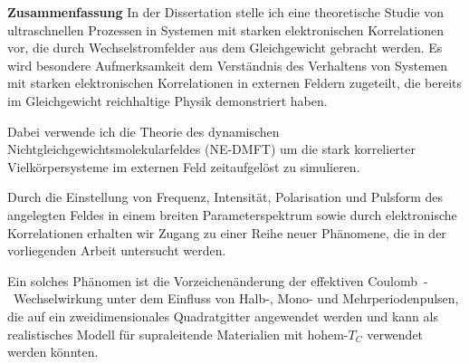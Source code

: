 






    

\textbf{Zusammenfassung} In der Dissertation stelle ich eine theoretische Studie von ultraschnellen Prozessen in Systemen mit starken elektronischen Korrelationen vor, die durch Wechselstromfelder aus dem Gleichgewicht gebracht werden. 
Es wird besondere Aufmerksamkeit dem Verständnis des Verhaltens von Systemen mit starken elektronischen Korrelationen in externen Feldern zugeteilt, die bereits im Gleichgewicht reichhaltige Physik demonstriert haben.

Dabei verwende ich die Theorie des dynamischen Nichtgleichgewichtsmolekularfeldes (NE-DMFT) um die stark korrelierter Vielkörpersysteme im
externen Feld zeitaufgelöst zu simulieren.

Durch die Einstellung von Frequenz, Intensität, Polarisation und Pulsform des angelegten Feldes in einem breiten Parameterspektrum sowie durch elektronische Korrelationen erhalten wir Zugang zu einer Reihe neuer Phänomene, die in der vorliegenden Arbeit untersucht werden.

Ein solches Phänomen ist die Vorzeichenänderung der effektiven 
Coulomb~-~Wechselwirkung unter dem Einfluss von Halb-, Mono- und Mehrperiodenpulsen, 
die auf ein zweidimensionales Quadratgitter angewendet werden und kann als realistisches Modell für supraleitende Materialien mit hohem-$T_C$ verwendet werden könnten.

